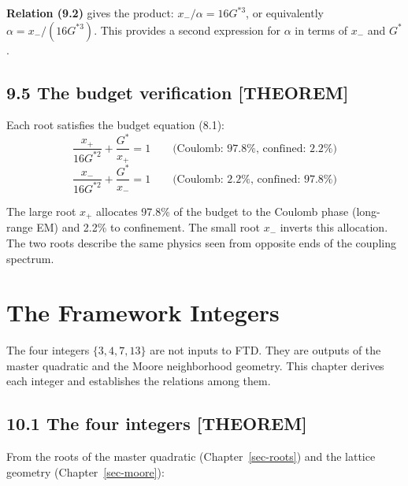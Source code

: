 \documentclass[
  11pt,
  letterpaper,
  twoside,
  openright]{book}
\begin{document}
\textbf{Relation (9.2)} gives the product: \(x_- / \alpha = 16G^{*3}\),
or equivalently \(\alpha = x_- / (16G^{*3})\). This provides a second
expression for \(\alpha\) in terms of \(x_-\) and \(G^*\).

\section{9.5 The budget verification
{[}THEOREM{]}}\label{the-budget-verification-theorem}

Each root satisfies the budget equation (8.1): \[
\frac{x_+}{16G^{*2}} + \frac{G^*}{x_+} = 1 \qquad \text{(Coulomb: 97.8\%, confined: 2.2\%)}
\] \[
\frac{x_-}{16G^{*2}} + \frac{G^*}{x_-} = 1 \qquad \text{(Coulomb: 2.2\%, confined: 97.8\%)}
\]

The large root \(x_+\) allocates 97.8\% of the budget to the Coulomb
phase (long-range EM) and 2.2\% to confinement. The small root \(x_-\)
inverts this allocation. The two roots describe the same physics seen
from opposite ends of the coupling spectrum.

\chapter{The Framework Integers}\label{sec-integers}

The four integers \(\{3, 4, 7, 13\}\) are not inputs to FTD. They are
outputs of the master quadratic and the Moore neighborhood geometry.
This chapter derives each integer and establishes the relations among
them.

\section{10.1 The four integers
{[}THEOREM{]}}\label{the-four-integers-theorem}

From the roots of the master quadratic (Chapter~\ref{sec-roots}) and the
lattice geometry (Chapter~\ref{sec-moore}):
\end{document}
